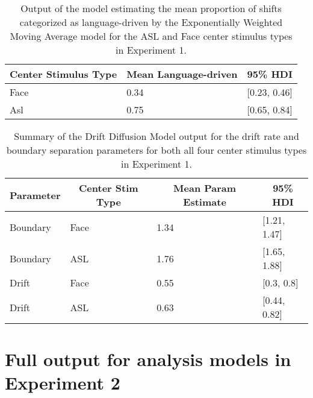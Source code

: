 \documentclass[,man,floatsintext]{apa6}
\begin{document}
\begin{appendix}
\begin{table}[h]
\begin{center}
\begin{threeparttable}
\caption{\label{tab:trio-guess-cuts}Output of the model estimating the mean proportion of shifts categorized as language-driven by the Exponentially Weighted Moving Average model for the ASL and Face center stimulus types in Experiment 1.}
\begin{tabular}{lll}
\toprule
Center Stimulus Type & \multicolumn{1}{c}{Mean Language-driven} & \multicolumn{1}{c}{95\% HDI}\\
\midrule
Face & 0.34 & [0.23, 0.46]\\
Asl & 0.75 & [0.65, 0.84]\\
\bottomrule
\end{tabular}
\end{threeparttable}
\end{center}
\end{table}

\begin{table}[h]
\begin{center}
\begin{threeparttable}
\caption{\label{tab:trio-hddm}Summary of the Drift Diffusion Model output for the drift rate and boundary separation parameters for both all four center stimulus types in Experiment 1.}
\begin{tabular}{llll}
\toprule
Parameter & \multicolumn{1}{c}{Center Stim Type} & \multicolumn{1}{c}{Mean Param Estimate} & \multicolumn{1}{c}{95\% HDI}\\
\midrule
Boundary & Face & 1.34 & [1.21, 1.47]\\
Boundary & ASL & 1.76 & [1.65, 1.88]\\
Drift & Face & 0.55 & [0.3, 0.8]\\
Drift & ASL & 0.63 & [0.44, 0.82]\\
\bottomrule
\end{tabular}
\end{threeparttable}
\end{center}
\end{table}

\hypertarget{full-output-for-analysis-models-in-experiment-2}{%
\section{Full output for analysis models in Experiment
2}\label{full-output-for-analysis-models-in-experiment-2}}


\end{appendix}
\end{document}
